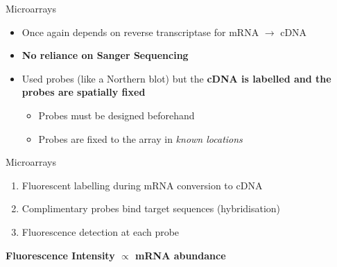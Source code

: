 \documentclass[aspectratio=169,11pt]{beamer}
\begin{document}
\begin{frame}{Microarrays}

	\begin{itemize}
		\item Once again depends on reverse transcriptase for mRNA $\rightarrow$ cDNA
		\item \textbf{No reliance on Sanger Sequencing}
		\item Used probes (like a Northern blot) but the \textbf{cDNA is labelled and the probes are spatially fixed}
		\begin{itemize}
			\item Probes must be designed beforehand
			\item Probes are fixed to the array in \textit{known locations}		
		\end{itemize}
	\end{itemize}
	
\end{frame}

\begin{frame}{Microarrays}

	\begin{enumerate}

		\item Fluorescent labelling during mRNA conversion to cDNA
		\item Complimentary probes bind target sequences (hybridisation)
		\item Fluorescence detection at each probe
	
	\end{enumerate}

	\begin{center}
	\textbf{Fluorescence Intensity $\propto$ mRNA abundance	}
	\end{center}

\end{frame}
\end{document}
